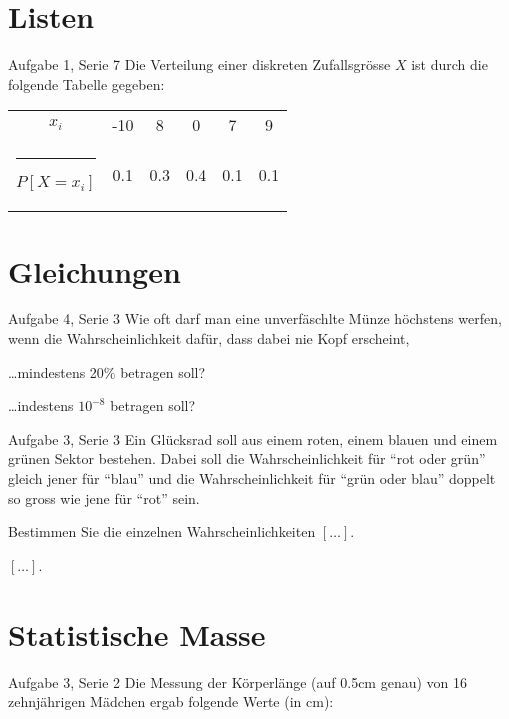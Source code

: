 \documentclass{beamer}
\begin{document}
\section{Listen}
\begin{frame}{Aufgabe 1, Serie 7}
Die Verteilung einer diskreten Zufallsgrösse $X$ ist durch die folgende Tabelle gegeben:

\begin{center}\begin{tabular}{c|ccccc}
$x_i$     & -10 & 8   & 0 & 7 & 9\\\hrule
$P[X=x_i]$& 0.1 & 0.3 & 0.4 & 0.1 & 0.1\\
\end{tabular}\end{center}

\section{Gleichungen}
\begin{frame}{Aufgabe 4, Serie 3}
Wie oft darf man eine unverfäschlte Münze höchstens werfen, wenn die Wahrscheinlichkeit
dafür, dass dabei nie Kopf erscheint,
\begin{outline}
\item \dots mindestens 20\% betragen soll?
\item \dots indestens $10^{-8}$ betragen soll?
\end{outline}
\end{frame}

\begin{frame}{Aufgabe 3, Serie 3}
Ein Glücksrad soll aus einem roten, einem blauen und einem grünen Sektor
bestehen. Dabei soll die Wahrscheinlichkeit für ``rot oder grün'' gleich jener
für ``blau'' und die Wahrscheinlichkeit für ``grün oder blau'' doppelt so gross
wie jene für ``rot'' sein.
\begin{outline}
\item Bestimmen Sie die einzelnen Wahrscheinlichkeiten $[\dots]$.
\item $[\dots]$.
\end{outline}
\end{frame}

\section{Statistische Masse}
\begin{frame}{Aufgabe 3, Serie 2}
Die Messung der Körperlänge (auf 0.5cm genau) von 16 zehnjährigen Mädchen ergab
folgende Werte (in cm):


\end{frame}
\end{frame}
\end{document}
